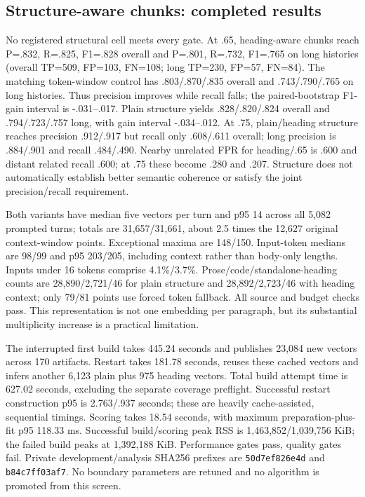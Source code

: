 \documentclass[11pt]{article}
\begin{document}
\subsection{Structure-aware chunks: completed results}
No registered structural cell meets every gate. At .65, heading-aware chunks
reach P=.832, R=.825, F1=.828 overall and P=.801, R=.732, F1=.765 on long
histories (overall TP=509, FP=103, FN=108; long TP=230, FP=57, FN=84).
The matching token-window control has .803/.870/.835 overall and
.743/.790/.765 on long histories. Thus precision improves while recall falls;
the paired-bootstrap F1-gain interval is -.031--.017. Plain structure yields
.828/.820/.824 overall and .794/.723/.757 long, with gain interval -.034--.012.
At .75, plain/heading structure reaches precision .912/.917 but recall only
.608/.611 overall; long precision is .884/.901 and recall .484/.490.
Nearby unrelated FPR for heading/.65 is .600 and distant related recall .600;
at .75 these become .280 and .207. Structure does not automatically establish
better semantic coherence or satisfy the joint precision/recall requirement.

Both variants have median five vectors per turn and p95 14 across all 5,082
prompted turns; totals are 31,657/31,661, about 2.5 times the 12,627 original
context-window points. Exceptional maxima are 148/150. Input-token medians
are 98/99 and p95 203/205, including context rather than body-only lengths.
Inputs under 16 tokens comprise 4.1\%/3.7\%. Prose/code/standalone-heading
counts are 28,890/2,721/46 for plain structure and 28,892/2,723/46 with heading
context; only 79/81 points use forced token fallback. All source and budget
checks pass. This representation is not one embedding per paragraph, but its
substantial multiplicity increase is a practical limitation.

The interrupted first build takes 445.24 seconds and publishes 23,084 new
vectors across 170 artifacts. Restart takes 181.78 seconds, reuses these cached
vectors and infers another 6,123 plain plus 975 heading vectors. Total build
attempt time is 627.02 seconds, excluding the separate coverage preflight.
Successful restart construction p95 is 2.763/.937 seconds; these are heavily
cache-assisted, sequential timings. Scoring takes 18.54 seconds, with maximum
preparation-plus-fit p95 118.33 ms. Successful build/scoring peak RSS is
1,463,852/1,039,756 KiB; the failed build peaks at 1,392,188 KiB. Performance
gates pass, quality gates fail. Private development/analysis SHA256 prefixes
are \texttt{50d7ef826e4d} and \texttt{b84c7ff03af7}. No boundary parameters are
retuned and no algorithm is promoted from this screen.
\end{document}
